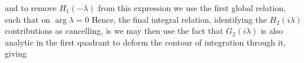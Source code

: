 \documentclass{article}
\begin{document}
and to remove $H_1(-\lambda)$ from this expression we use the first global relation, such that on $\arg\lambda = 0$
Hence, the final integral relation, identifying the $H_2(i\lambda)$ contributions as cancelling, is 
we may then use the fact that $G_2(i\lambda)$ is also analytic in the first quadrant to deform the contour of integration through it, giving 
\end{document}
